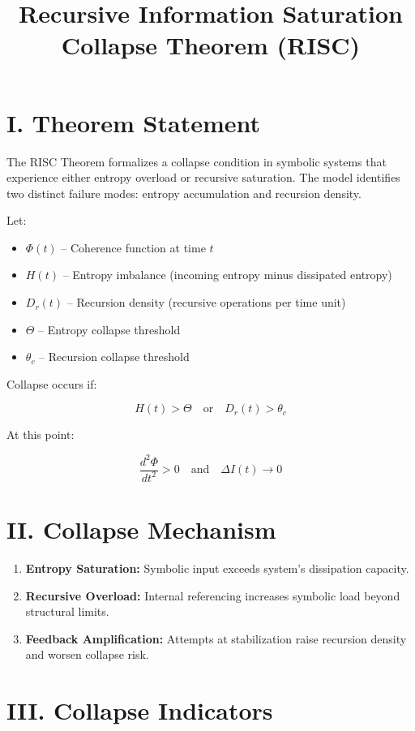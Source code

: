 \documentclass[12pt]{article}
\title{Recursive Information Saturation Collapse Theorem (RISC)}
\author{}
\date{}
\begin{document}
\maketitle

\section*{I. Theorem Statement}

The RISC Theorem formalizes a collapse condition in symbolic systems that experience either entropy overload or recursive saturation. The model identifies two distinct failure modes: entropy accumulation and recursion density.

Let:
\begin{itemize}
  \item $\Phi(t)$ – Coherence function at time $t$
  \item $H(t)$ – Entropy imbalance (incoming entropy minus dissipated entropy)
  \item $D_r(t)$ – Recursion density (recursive operations per time unit)
  \item $\Theta$ – Entropy collapse threshold
  \item $\theta_c$ – Recursion collapse threshold
\end{itemize}

Collapse occurs if:

\[
H(t) > \Theta \quad \text{or} \quad D_r(t) > \theta_c
\]

At this point:

\[
\frac{d^2 \Phi}{dt^2} > 0 \quad \text{and} \quad \Delta I(t) \rightarrow 0
\]

\section*{II. Collapse Mechanism}

\begin{enumerate}
  \item \textbf{Entropy Saturation:} Symbolic input exceeds system’s dissipation capacity.
  \item \textbf{Recursive Overload:} Internal referencing increases symbolic load beyond structural limits.
  \item \textbf{Feedback Amplification:} Attempts at stabilization raise recursion density and worsen collapse risk.
\end{enumerate}

\section*{III. Collapse Indicators}
\end{document}
